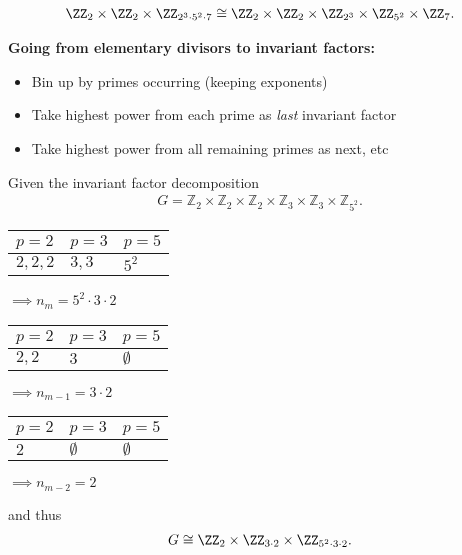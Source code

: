 \begin{example}

\begin{align*}
\ZZ_2 \times \ZZ_2 \times \ZZ_{2^3 \cdot 5^2 \cdot 7}
\cong
\ZZ_2 \times \ZZ_2 \times \ZZ_{2^3} \times \ZZ_{5^2} \times \ZZ_7
.\end{align*}

\end{example}

\textbf{Going from elementary divisors to invariant factors:}

\begin{itemize}
\tightlist
\item
  Bin up by primes occurring (keeping exponents)
\item
  Take highest power from each prime as \emph{last} invariant factor
\item
  Take highest power from all remaining primes as next, etc
\end{itemize}

\begin{example}

Given the invariant factor decomposition \begin{align*}
G = {\mathbb{Z}_{2}\times\mathbb{Z}_{2}\times\mathbb{Z}_{2}\times\mathbb{Z}_{3}\times\mathbb{Z}_{3}\times\mathbb{Z}_{5^2}}
.\end{align*}

\begin{longtable}[]{@{}lll@{}}
\toprule
\(p = 2\) & \(p= 3\) & \(p =5\)\tabularnewline
\midrule
\endhead
\(2,2,2\) & \(3,3\) & \(5^2\)\tabularnewline
\bottomrule
\end{longtable}

\(\implies n_m = 5^2 \cdot 3 \cdot 2\)

\begin{longtable}[]{@{}lll@{}}
\toprule
\(p = 2\) & \(p= 3\) & \(p =5\)\tabularnewline
\midrule
\endhead
\(2,2\) & \(3\) & \(\emptyset\)\tabularnewline
\bottomrule
\end{longtable}

\(\implies n_{m-1} = 3 \cdot 2\)

\begin{longtable}[]{@{}lll@{}}
\toprule
\(p = 2\) & \(p= 3\) & \(p =5\)\tabularnewline
\midrule
\endhead
\(2\) & \(\emptyset\) & \(\emptyset\)\tabularnewline
\bottomrule
\end{longtable}

\(\implies n_{m-2} = 2\)

and thus \begin{align*}
G\cong \ZZ_2 \times \ZZ_{3\cdot 2} \times \ZZ_{5^2 \cdot 3 \cdot 2}
.\end{align*}

\end{example}

